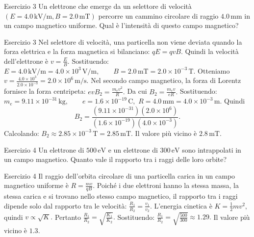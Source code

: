 \documentclass[a4paper]{article}
\begin{document}
\begin{snippetexercise}{Esercizio 3}
    Un elettrone che emerge da un selettore di velocità
    \((E = 4.0\,\mathrm{kV/m}, B = 2.0\,\mathrm{mT})\) percorre un cammino
    circolare di raggio \(4.0\,\mathrm{mm}\) in un campo magnetico uniforme.
    Qual è l'intensità di questo campo magnetico?

\end{snippetexercise}
\begin{snippetsolution}{Esercizio 3}
    Nel selettore di velocità, una particella non viene deviata quando la forza
    elettrica e la forza magnetica si bilanciano:
    \(qE = qvB.\)
    Quindi la velocità dell'elettrone è
    \(v = \frac{E}{B}.\)
    Sostituendo:
    \(E = 4.0\,\mathrm{kV/m} = 4.0 \times 10^3\,\mathrm{V/m}, \qquad B = 2.0\,\mathrm{mT} = 2.0 \times 10^{-3}\,\mathrm{T}.\)
    Otteniamo
    \(v = \frac{4.0 \times 10^3}{2.0 \times 10^{-3}} = 2.0 \times 10^6\,\mathrm{m/s}.\)
    Nel secondo campo magnetico, la forza di Lorentz fornisce la forza
    centripeta:
    \(evB_2 = \frac{m_ev^2}{R}.\)
    Da cui
    \(B_2 = \frac{m_ev}{eR}.\)
    Sostituendo:
    \(m_e = 9.11 \times 10^{-31}\,\mathrm{kg}, \qquad e = 1.6 \times 10^{-19}\,\mathrm{C},\)
    \(R = 4.0\,\mathrm{mm} = 4.0 \times 10^{-3}\,\mathrm{m}.\)
    Quindi
    \[
        B_2 =
        \frac{
            \left(9.11 \times 10^{-31}\right)
            \left(2.0 \times 10^6\right)
        }{
            \left(1.6 \times 10^{-19}\right)
            \left(4.0 \times 10^{-3}\right)
        }.
    \]
    Calcolando:
    \(B_2 \approx 2.85 \times 10^{-3}\,\mathrm{T} = 2.85\,\mathrm{mT}.\)
    Il valore più vicino è
    \(\boxed{2.8\,\mathrm{mT}}.\)
\end{snippetsolution}
\begin{snippetexercise}{Esercizio 4}
    Un elettrone di \(500\,\mathrm{eV}\) e un elettrone di \(300\,\mathrm{eV}\)
    sono intrappolati in un campo magnetico. Quanto vale il rapporto tra i
    raggi delle loro orbite?

\end{snippetexercise}
\begin{snippetsolution}{Esercizio 4}
    Il raggio dell'orbita circolare di una particella carica in un campo
    magnetico uniforme è
    \(R = \frac{mv}{qB}.\)
    Poiché i due elettroni hanno la stessa massa, la stessa carica e si trovano
    nello stesso campo magnetico, il rapporto tra i raggi dipende solo dal
    rapporto tra le velocità:
    \(\frac{R_1}{R_2} = \frac{v_1}{v_2}.\)
    L'energia cinetica è
    \(K = \frac{1}{2}mv^2,\)
    quindi
    \(v \propto \sqrt{K}.\)
    Pertanto
    \(\frac{R_1}{R_2} = \sqrt{\frac{K_1}{K_2}}.\)
    Sostituendo:
    \(\frac{R_1}{R_2} = \sqrt{\frac{500}{300}} \approx 1.29.\)
    Il valore più vicino è
    \(\boxed{1.3}.\)
\end{snippetsolution}
\end{document}
